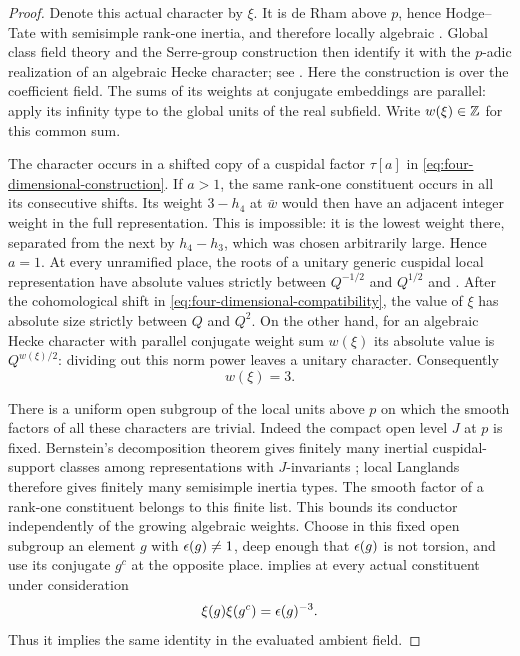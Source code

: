 \begin{proof}
Denote this actual character by $\xi$.  It is de Rham above $p$,
hence Hodge--Tate with semisimple rank-one inertia, and therefore
locally algebraic
\citep[Chapter~III, Section~1.2 and Appendix~A7, Theorem~3]{Serre1968}.
Global class field theory and the Serre-group construction then
identify it with the $p$-adic realization of an algebraic Hecke
character; see \citet[Chapter~III, Sections~2.2--2.3, including
the proof, and Chapter~II, Section~2.7]{Serre1968}.
Here the construction is over the coefficient field.  The
sums of its weights at conjugate embeddings are parallel: apply its
infinity type to the global units of the real subfield.  Write
$w(\xi)\in\mathbb Z$ for this common sum.

The character occurs in a shifted copy of a cuspidal factor
$\tau[a]$ in \cref{eq:four-dimensional-construction}.  If $a>1$,
the same rank-one constituent occurs in all its consecutive shifts.
Its weight $3-h_4$ at $\bar w$ would then have an adjacent integer
weight in the full representation.  This is impossible: it is the
lowest weight there, separated from the next by $h_4-h_3$, which
was chosen arbitrarily large.  Hence $a=1$.
At every unramified place, the roots of a unitary generic cuspidal
local representation have absolute values strictly between
$Q^{-1/2}$ and $Q^{1/2}$
\citep[Theorem~7.5]{Tadic1986} and
\citep[Theorem~9.7]{Zelevinsky1980}.  After the cohomological shift in
\cref{eq:four-dimensional-compatibility}, the value of $\xi$ has
absolute size strictly between $Q$ and $Q^2$.  On the other hand,
for an algebraic Hecke character with parallel conjugate weight
sum $w(\xi)$ its absolute value is $Q^{w(\xi)/2}$: dividing out
this norm power leaves a unitary character.  Consequently
\begin{equation}
                    w(\xi)=3.
 \label{eq:rank-one-weight}
\end{equation}

There is a uniform open subgroup of the local units above $p$ on
which the smooth factors of all these characters are trivial.
Indeed the compact open level $J$ at $p$ is fixed.
Bernstein's decomposition theorem gives finitely many inertial
cuspidal-support classes among representations with $J$-invariants
\citep[Section~2.3]{BernsteinDeligneKazhdan1986}; local Langlands therefore
gives finitely many semisimple inertia types.  The smooth factor of
a rank-one constituent belongs to this finite list.  This bounds
its conductor independently of the growing algebraic weights.
Choose in this fixed open subgroup an element $g$ with
$\epsilon(g)\ne1$, deep enough that $\epsilon(g)$ is not torsion, and use
its conjugate $g^c$ at the opposite place.   implies at every actual constituent under
consideration
\begin{equation}
                    \xi(g)\xi(g^c)=\epsilon(g)^{-3}.
 \label{eq:weight-three-unit}
\end{equation}
Thus it implies the same identity in the evaluated ambient field.


\end{proof}
